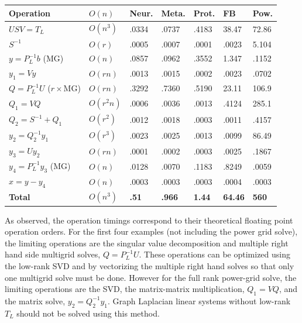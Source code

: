 \documentclass{article}
\begin{document}
\begin{center}
\renewcommand{\arraystretch}{1.5}
    \begin{tabular}{ | l | l | l | l | l | l | l |}
    \hline
    \textbf{Operation} & \textbf{$O(n)$} & \textbf{Neur.} & \textbf{Meta.} & \textbf{Prot.} & \textbf{FB} & \textbf{Pow.} \\ \hline
    $USV = T_L$ & $O(n^3)$ & .0334 & .0737 & .4183 & 38.47 & 72.86  \\ \hline
    $S^{-1}$ & $O(r)$ & .0005 & .0007 & .0001 & .0023 & 5.104 \\ \hline
    $y = P_L^{-1}b$ (MG) & $O(n)$ & .0857 & .0962 & .3552 & 1.347 & .1152  \\  \hline
    $y_1 = Vy$ & $O(rn)$ & .0013 & .0015 & .0002 & .0023 & .0702 \\ \hline
    $Q = P_L^{-1}U$ ($r\times$MG) & $O(rn)$ & .3292 & .7360 & .5190 & 23.11 & 106.9  \\ \hline
    $Q_1 = VQ$ & $O(r^2 n)$ & .0006 & .0036 & .0013 & .4124 & 285.1 \\ \hline
    $Q_2 = S^{-1} + Q_1$ & $O(r^2)$ & .0012 & .0018 & .0003 & .0011 & .4157 \\ \hline
    $y_2 = Q_2^{-1}y_1$ & $O(r^3)$ & .0023 & .0025 & .0013 & .0099 & 86.49 \\ \hline
    $y_3 = Uy_2$ & $O(rn)$ & .0001 & .0002 & .0003 & .0025 & .1867 \\ \hline
    $y_4 = P_L^{-1}y_3$ (MG) & $O(n)$ &.0128 & .0070 & .1183 & .8249 & .0059 \\ \hline
    $x = y - y_4$ & $O(n)$ &.0003 & .0003 & .0003 & .0004 & .0003 \\ \hline
    \textbf{Total} & \textbf{$O(n^3)$} & \textbf{.51} & \textbf{.966} & \textbf{1.44} & \textbf{64.46} & \textbf{560} \\
    \hline
    \end{tabular}
\end{center}
As observed, the operation timings correspond to their theoretical floating point operation orders. For the first four examples (not including the power grid solve), the limiting operations are the singular value decomposition and multiple right hand side multigrid solves, $Q = P_L^{-1}U$. These operations can be optimized using the low-rank SVD and by vectorizing the multiple right hand solves so that only one multigrid solve must be done. However for the full rank power-grid solve, the limiting operations are the SVD, the matrix-matrix multiplication, $Q_1 = VQ$, and the matrix solve, $y_2 = Q_2^{-1}y_1$. Graph Laplacian linear systems without low-rank $T_L$ should not be solved using this method.

%
%
\end{document}
